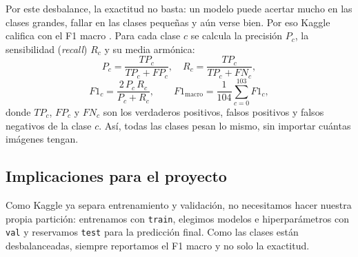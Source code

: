 Por este desbalance, la exactitud no basta: un modelo puede acertar mucho en las clases grandes, fallar en las clases pequeñas y aún verse bien. Por eso Kaggle califica con el F1 macro \parencite{kagglePetalsMetal}. Para cada clase $c$ se calcula la precisión $P_c$, la sensibilidad (\textit{recall}) $R_c$ y su media armónica:
\begin{equation}
P_c=\frac{TP_c}{TP_c+FP_c}, \quad R_c=\frac{TP_c}{TP_c+FN_c},
\end{equation}
\begin{equation}
F1_c=\frac{2\,P_c\,R_c}{P_c+R_c}, \qquad F1_{\text{macro}}=\frac{1}{104}\sum_{c=0}^{103}F1_c,
\end{equation}
donde $TP_c$, $FP_c$ y $FN_c$ son los verdaderos positivos, falsos positivos y falsos negativos de la clase $c$. Así, todas las clases pesan lo mismo, sin importar cuántas imágenes tengan.

\subsection{Implicaciones para el proyecto}
Como Kaggle ya separa entrenamiento y validación, no necesitamos hacer nuestra propia partición: entrenamos con \texttt{train}, elegimos modelos e hiperparámetros con \texttt{val} y reservamos \texttt{test} para la predicción final. Como las clases están desbalanceadas, siempre reportamos el F1 macro y no solo la exactitud.
